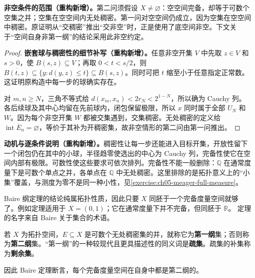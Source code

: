 \documentclass[../../main.tex]{subfiles}
\begin{document}
\begin{remark}
\textbf{非空条件的范围（重构新增）。}第二问须假设 $X\ne\varnothing$：空空间完备，却等于可数个空集之并；空集在空空间内无处稠密。第一问对空空间仍成立，因为空集在空空间中稠密。原证明从“交稠密”推出“交非空”时，正是使用了底空间非空。下文关于“空间自身非第一纲”的结论采用此非空约定。
\end{remark}
\begin{proof}
\textbf{嵌套球与稠密性的细节补写（重构新增）。}任意非空开集 $V$ 中先取 $z\in V$ 和 $s>0$，使 $B(s,z)\subseteq V$；再取 $0<t<s/2$，则 $\overline{B(t,z)}\subseteq\{y:d(y,z)\le t\}\subseteq B(s,z)$。同时可把 $t$ 缩至小于任意指定正常数。这证明原构造中每一步的球确实存在。

对 $m,n\ge N$，三角不等式给 $d(x_m,x_n)<2r_N<2^{1-N}$，所以确为 Cauchy 列。各后续球及其中心均留在先前球内，闭包保留极限，所以 $x$ 同时属于全部 $U_N$ 和 $W$。因为每个非空开集 $W$ 都被交集遇到，交集稠密。无处稠密的定义给 $\operatorname{int}\overline E_n=\varnothing$，等价于其补为开稠密集，故非空情形的第二问由第一问推出。
\end{proof}
\begin{remark}
\textbf{动机与逐条件说明（重构新增）。}稠密性让每一步还能进入目标开集，开放性留下一个闭包仍在其中的小球，半径趋零使选出的中心为 Cauchy 列，完备性使它在空间内部有极限。可数性使这些要求可依次排列。完备性不能一般删除：$\mathbb Q$ 在通常度量下是可数个单点之并，各单点在 $\mathbb Q$ 中无处稠密。这里排除的是拓扑意义上的“小集”覆盖，与测度为零不是同一种小性，见\cref{exercise:ch05-meager-full-measure}。
\end{remark}
Baire 纲定理的结论纯属拓扑性质，因此只要 $X$ 同胚于一个完备度量空间就够了。例如定理适用于 $X=(0,1)$；它在通常度量下并不完备，但同胚于 $\mathbb R$。
定理的名字来自 Baire 关于集合的术语。
\begin{definition}\label{definition:ch05-category}
若 $X$ 为拓扑空间，$E\subseteq X$ 是可数个无处稠密集的并，就称它为\textbf{第一纲}集；否则称为\textbf{第二纲}集。“第一纲”的一种较现代且更具描述性的同义词是\textbf{疏集}。疏集的补集称为\textbf{剩余集}。
\end{definition}
因此 Baire 定理断言，每个完备度量空间在自身中都是第二纲的。
\end{document}
